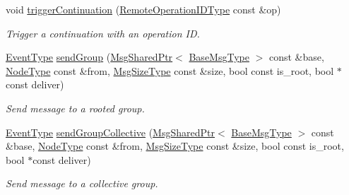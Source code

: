 \begin{DoxyCompactItemize}
void \hyperlink{structvt_1_1group_1_1_group_manager_ae83ca69874fc3008a211b12458a18362}{trigger\+Continuation} (\hyperlink{namespacevt_1_1group_a73f2624ddeb535b39a08b6524f26b244}{Remote\+Operation\+I\+D\+Type} const \&op)
\begin{DoxyCompactList}\small\item\em Trigger a continuation with an operation ID. \end{DoxyCompactList}\item 
\hyperlink{namespacevt_a009267401def7ae8bf201892222d060f}{Event\+Type} \hyperlink{structvt_1_1group_1_1_group_manager_acc6d8c736c20fc2fcdf60985f4864aaf}{send\+Group} (\hyperlink{namespacevt_ab2b3d506ec8e8d1540aede826d84a239}{Msg\+Shared\+Ptr}$<$ \hyperlink{namespacevt_a44d0d4e144748f2b19a1cfd962f50338}{Base\+Msg\+Type} $>$ const \&base, \hyperlink{namespacevt_a866da9d0efc19c0a1ce79e9e492f47e2}{Node\+Type} const \&from, \hyperlink{namespacevt_abfa009d900299ac1df967b40ea8f2c8a}{Msg\+Size\+Type} const \&size, bool const is\+\_\+root, bool $\ast$const deliver)
\begin{DoxyCompactList}\small\item\em Send message to a rooted group. \end{DoxyCompactList}\item 
\hyperlink{namespacevt_a009267401def7ae8bf201892222d060f}{Event\+Type} \hyperlink{structvt_1_1group_1_1_group_manager_a93519c585aaedf3e0120b7073567bbe5}{send\+Group\+Collective} (\hyperlink{namespacevt_ab2b3d506ec8e8d1540aede826d84a239}{Msg\+Shared\+Ptr}$<$ \hyperlink{namespacevt_a44d0d4e144748f2b19a1cfd962f50338}{Base\+Msg\+Type} $>$ const \&base, \hyperlink{namespacevt_a866da9d0efc19c0a1ce79e9e492f47e2}{Node\+Type} const \&from, \hyperlink{namespacevt_abfa009d900299ac1df967b40ea8f2c8a}{Msg\+Size\+Type} const \&size, bool const is\+\_\+root, bool $\ast$const deliver)
\begin{DoxyCompactList}\small\item\em Send message to a collective group. \end{DoxyCompactList}\end{DoxyCompactItemize}
